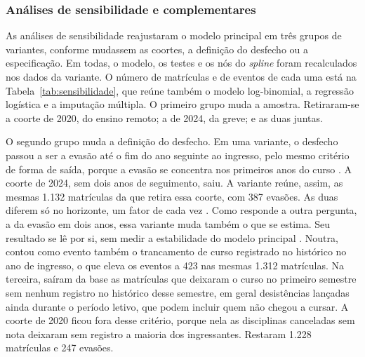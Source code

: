 \documentclass[12pt,a4paper]{article}
\begin{document}
\subsubsection{Análises de sensibilidade e complementares}
\label{sec:sensibilidade}

As análises de sensibilidade reajustaram o modelo principal em três grupos de variantes, conforme mudassem as coortes, a definição do desfecho ou a especificação. Em todas, o modelo, os testes e os nós do \textit{spline} foram recalculados nos dados da variante. O número de matrículas e de eventos de cada uma está na Tabela~\ref{tab:sensibilidade}, que reúne também o modelo log-binomial, a regressão logística e a imputação múltipla. O primeiro grupo muda a amostra. Retiraram-se a coorte de 2020, do ensino remoto; a de 2024, da greve; e as duas juntas.

O segundo grupo muda a definição do desfecho. Em uma variante, o desfecho passou a ser a evasão até o fim do ano seguinte ao ingresso, pelo mesmo critério de forma de saída, porque a evasão se concentra nos primeiros anos do curso \citep{starkEvasaoNoEnsino2025}. A coorte de 2024, sem dois anos de seguimento, saiu. A variante reúne, assim, as mesmas 1.132 matrículas da que retira essa coorte, com 387 evasões. As duas diferem só no horizonte, um fator de cada vez \citep{thabane2013tutorial}. Como responde a outra pergunta, a da evasão em dois anos, essa variante muda também o que se estima. Seu resultado se lê por si, sem medir a estabilidade do modelo principal \citep{morris2014choosing}. Noutra, contou como evento também o trancamento de curso registrado no histórico no ano de ingresso, o que eleva os eventos a 423 nas mesmas 1.312 matrículas. Na terceira, saíram da base as matrículas que deixaram o curso no primeiro semestre sem nenhum registro no histórico desse semestre, em geral desistências lançadas ainda durante o período letivo, que podem incluir quem não chegou a cursar. A coorte de 2020 ficou fora desse critério, porque nela as disciplinas canceladas sem nota deixaram sem registro a maioria dos ingressantes. Restaram 1.228 matrículas e 247 evasões.
\end{document}
